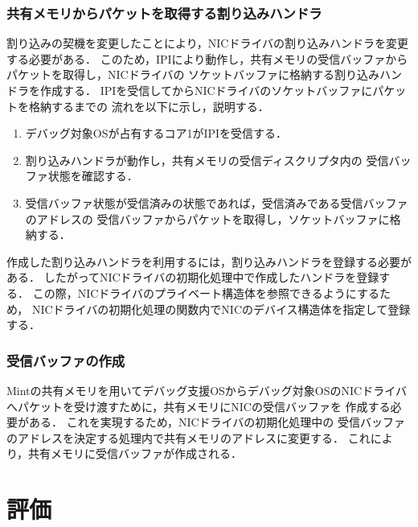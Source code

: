 \documentclass[tanilab-enum]{graduate}
\begin{document}
\subsection*{共有メモリからパケットを取得する割り込みハンドラ}\label{handler}
割り込みの契機を変更したことにより，NICドライバの割り込みハンドラを変更する必要がある．
このため，IPIにより動作し，共有メモリの受信バッファからパケットを取得し，NICドライバの
ソケットバッファに格納する割り込みハンドラを作成する．
IPIを受信してからNICドライバのソケットバッファにパケットを格納するまでの
流れを以下に示し，説明する．
\begin{enumerate}
    \item 
        デバッグ対象OSが占有するコア1がIPIを受信する．
    \item 
        割り込みハンドラが動作し，共有メモリの受信ディスクリプタ内の
        受信バッファ状態を確認する．
    \item 
        受信バッファ状態が受信済みの状態であれば，受信済みである受信バッファのアドレスの
        受信バッファからパケットを取得し，ソケットバッファに格納する．
\end{enumerate}
作成した割り込みハンドラを利用するには，割り込みハンドラを登録する必要がある．
したがってNICドライバの初期化処理中で作成したハンドラを登録する．
この際，NICドライバのプライベート構造体を参照できるようにするため，
NICドライバの初期化処理の関数内でNICのデバイス構造体を指定して登録する．
\subsection*{受信バッファの作成}
Mintの共有メモリを用いてデバッグ支援OSからデバッグ対象OSのNICドライバ
へパケットを受け渡すために，共有メモリにNICの受信バッファを
作成する必要がある．
これを実現するため，NICドライバの初期化処理中の
受信バッファのアドレスを決定する処理内で共有メモリのアドレスに変更する．
これにより，共有メモリに受信バッファが作成される．
\chapter{評価}\label{estimaion}
\end{document}
